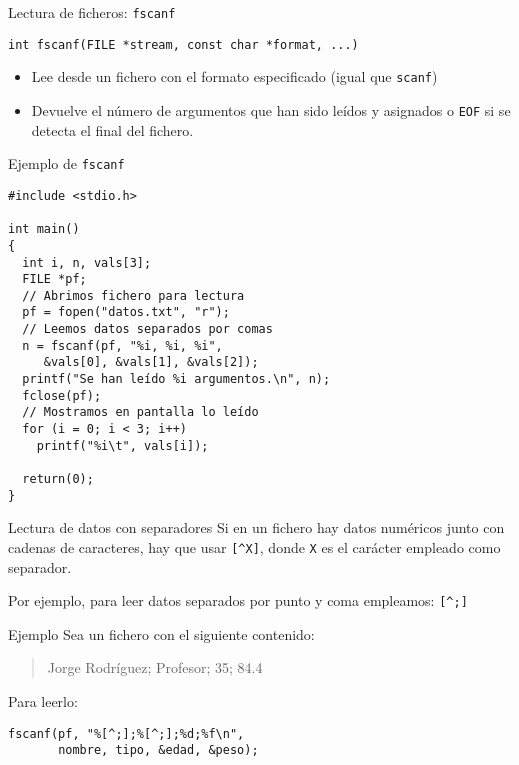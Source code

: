 \documentclass[usenames,svgnames,dvipsnames, aspectratio=169]{beamer}
\begin{document}
\begin{frame}[label={sec:org69090cc},fragile]{Lectura de ficheros: \texttt{fscanf}}
 \lstset{language=C,label= ,caption= ,captionpos=b,numbers=none}
\begin{lstlisting}
int fscanf(FILE *stream, const char *format, ...)
\end{lstlisting}

\begin{itemize}
\item Lee desde un fichero con el formato especificado (\alert{igual que \texttt{scanf}})

\item Devuelve el número de argumentos que han sido leídos y asignados o \texttt{EOF} si se detecta el final del fichero.
\end{itemize}
\end{frame}


\begin{frame}[label={sec:org174150d},fragile,plain]{Ejemplo de \texttt{fscanf}}
 \lstset{language=C,label= ,caption= ,captionpos=b,numbers=none}
\begin{lstlisting}
#include <stdio.h>

int main()
{
  int i, n, vals[3];
  FILE *pf;
  // Abrimos fichero para lectura
  pf = fopen("datos.txt", "r");
  // Leemos datos separados por comas
  n = fscanf(pf, "%i, %i, %i",
	 &vals[0], &vals[1], &vals[2]);
  printf("Se han leído %i argumentos.\n", n);
  fclose(pf);
  // Mostramos en pantalla lo leído
  for (i = 0; i < 3; i++)
    printf("%i\t", vals[i]);

  return(0);
}
\end{lstlisting}
\end{frame}



\begin{frame}[label={sec:org20555de},fragile]{Lectura de datos con separadores}
 Si en un fichero hay datos numéricos junto con cadenas de caracteres, hay que usar \texttt{[\textasciicircum{}X]}, donde \texttt{X} es el carácter empleado como separador. 

Por ejemplo, para leer datos separados por punto y coma empleamos: \texttt{[\textasciicircum{};]}

\begin{block}{Ejemplo}
Sea un fichero con el siguiente contenido:
\begin{quote}
Jorge Rodríguez; Profesor; 35; 84.4
\end{quote}

Para leerlo:
\lstset{language=C,label= ,caption= ,captionpos=b,numbers=none}
\begin{lstlisting}
fscanf(pf, "%[^;];%[^;];%d;%f\n",
       nombre, tipo, &edad, &peso);
\end{lstlisting}
\end{block}
\end{frame}
\end{document}
